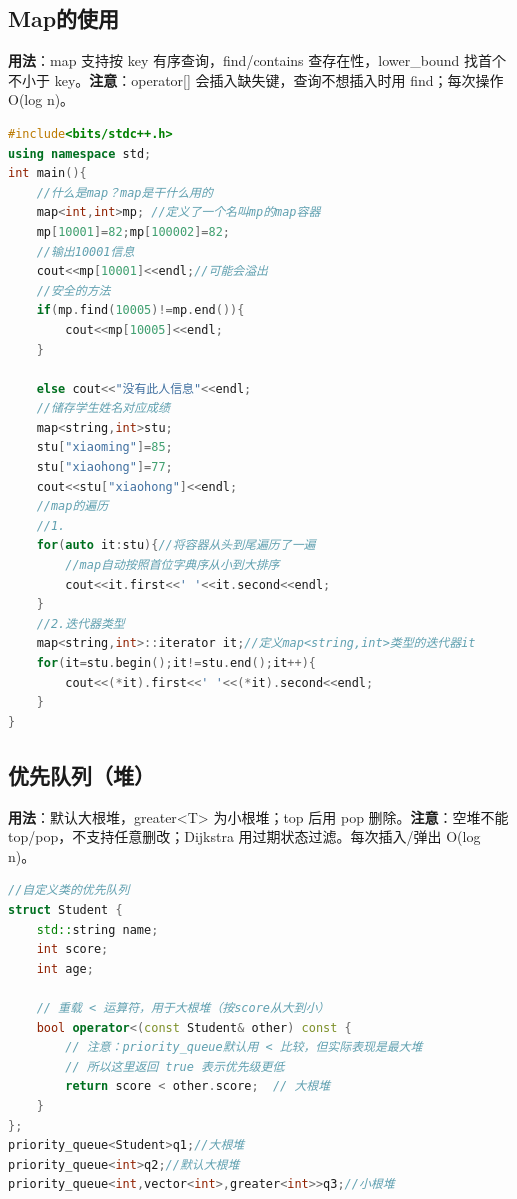 \documentclass[a4paper,9pt]{extarticle}
\begin{document}
\subsection{Map的使用}

\textbf{用法}：map 支持按 key 有序查询，find/\allowbreak{}contains 查存在性，lower\_\allowbreak{}bound 找首个不小于 key。\textbf{注意}：operator[] 会插入缺失键，查询不想插入时用 find；每次操作 O(log n)。

\begin{lstlisting}[language={C++}]
#include<bits/stdc++.h>
using namespace std;
int main(){
	//什么是map？map是干什么用的
	map<int,int>mp; //定义了一个名叫mp的map容器
	mp[10001]=82;mp[100002]=82;
	//输出10001信息
	cout<<mp[10001]<<endl;//可能会溢出
	//安全的方法
	if(mp.find(10005)!=mp.end()){
		cout<<mp[10005]<<endl;
	}

    else cout<<"没有此人信息"<<endl;
	//储存学生姓名对应成绩
	map<string,int>stu;
	stu["xiaoming"]=85;
	stu["xiaohong"]=77;
	cout<<stu["xiaohong"]<<endl;
	//map的遍历
    //1.
	for(auto it:stu){//将容器从头到尾遍历了一遍
		//map自动按照首位字典序从小到大排序
		cout<<it.first<<' '<<it.second<<endl;
	}
	//2.迭代器类型
	map<string,int>::iterator it;//定义map<string,int>类型的迭代器it
	for(it=stu.begin();it!=stu.end();it++){
		cout<<(*it).first<<' '<<(*it).second<<endl;
	}
}
\end{lstlisting}

\subsection{优先队列（堆）}

\textbf{用法}：默认大根堆，greater<\allowbreak{}T> 为小根堆；top 后用 pop 删除。\textbf{注意}：空堆不能 top/\allowbreak{}pop，不支持任意删改；Dijkstra 用过期状态过滤。每次插入/弹出 O(log n)。

\begin{lstlisting}[language={C++}]
//自定义类的优先队列
struct Student {
    std::string name;
    int score;
    int age;
    
    // 重载 < 运算符，用于大根堆（按score从大到小）
    bool operator<(const Student& other) const {
        // 注意：priority_queue默认用 < 比较，但实际表现是最大堆
        // 所以这里返回 true 表示优先级更低
        return score < other.score;  // 大根堆
    }
};
priority_queue<Student>q1;//大根堆
priority_queue<int>q2;//默认大根堆
priority_queue<int,vector<int>,greater<int>>q3;//小根堆
\end{lstlisting}
\end{document}
